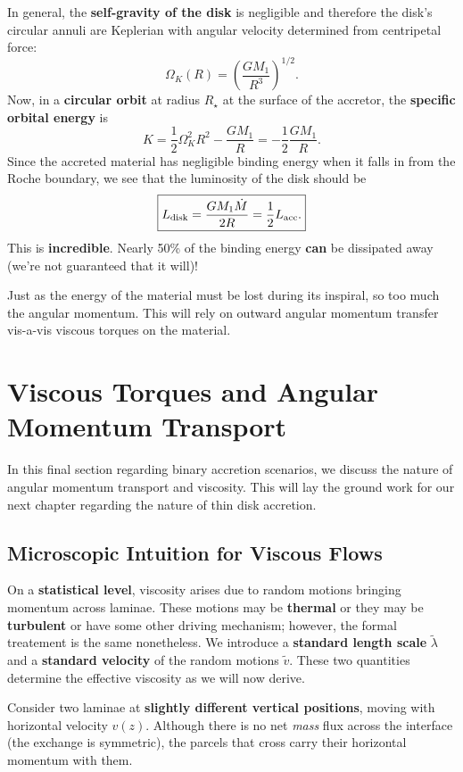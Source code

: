 \par
In general, the \textbf{self-gravity of the disk} is negligible and therefore the disk's circular annuli are Keplerian with angular velocity determined from centripetal force:
\[
\Omega_K(R) = \left(\frac{GM_1}{R^3}\right)^{1/2}.
\]
Now, in a \textbf{circular orbit} at radius $R_\star$ at the surface of the accretor, the \textbf{specific orbital energy} is
\[
K = \frac{1}{2}\Omega_K^2R^2 - \frac{GM_1}{R} = -\frac{1}{2} \frac{GM_1}{R}.
\]
Since the accreted material has negligible binding energy when it falls in from the Roche boundary, we see that the luminosity of the disk should be
\begin{equation}
    \boxed{
    L_{\rm disk} = \frac{GM_1\dot{M}}{2R} = \frac{1}{2}L_{\rm acc}.
    }
\end{equation}
This is \textbf{incredible}. Nearly 50\% of the binding energy \textbf{can} be dissipated away (we're not guaranteed that it will)!
\par
Just as the energy of the material must be lost during its inspiral, so too much the angular momentum. This will rely on outward angular momentum transfer vis-a-vis viscous torques on the material.

\section{Viscous Torques and Angular Momentum Transport}

In this final section regarding binary accretion scenarios, we discuss the nature of angular momentum transport and viscosity. This will lay the ground work for our next chapter regarding the nature of thin disk accretion.

\subsection{Microscopic Intuition for Viscous Flows}
On a \textbf{statistical level}, viscosity arises due to random motions bringing momentum across laminae. These motions may be \textbf{thermal} or they may be \textbf{turbulent} or have some other driving mechanism; however, the formal treatement is the same nonetheless. We introduce a \textbf{standard length scale} $\tilde{\lambda}$ and a \textbf{standard velocity} of the random motions $\tilde{v}$. These two quantities determine the effective viscosity as we will now derive.

Consider two laminae at \textbf{slightly different vertical positions}, moving with horizontal velocity $v(z)$. 
Although there is no net \emph{mass} flux across the interface (the exchange is symmetric),  the parcels that cross carry their horizontal momentum with them. 

